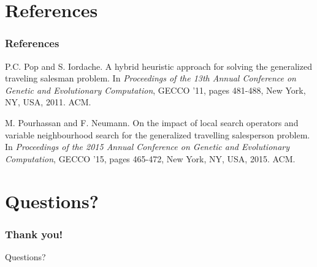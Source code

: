 \documentclass{beamer}
\newcommand{\linespace}{\vskip 0.25cm}
\begin{document}



\section*{References}

\begin{frame} 
	\frametitle{References} 
	\begin{thebibliography}{lskdjf}
P.C. Pop and S. Iordache.
A hybrid heuristic approach for solving the generalized traveling salesman problem.
\newblock In \textit{Proceedings of the 13th Annual Conference on Genetic and Evolutionary Computation}, GECCO '11, pages 481-488, New York, NY, USA, 2011. ACM. 
	
M. Pourhassan and F. Neumann.
On the impact of local search operators and variable neighbourhood search for the generalized travelling salesperson problem.
\newblock In \textit{Proceedings of the 2015 Annual Conference on Genetic and Evolutionary Computation}, GECCO '15, pages 465-472, New York, NY, USA, 2015. ACM. 
  
  	\end{thebibliography}
	\linespace

\end{frame} 
\section*{Questions?}
\begin{frame}
\frametitle{Thank you!}
\begin{center}
\begin{large}
	Questions?
\end{large}
\end{center}
\end{frame}
\end{document}
